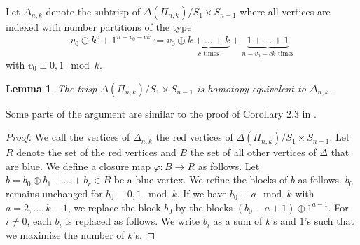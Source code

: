 \documentclass{elsarticle}
\newtheorem{lem}[df]{Lemma}
\begin{document}
Let $\Delta_{n,k}$ denote the subtrisp of $\Delta(\Pi_{n,k})/S_1\times S_{n-1}$ where all vertices are indexed with number partitions of the type
\[v_0\oplus k^c+1^{n-v_0-ck}:=v_0\oplus\underbrace{k+\dots+k}_\text{$c$ times}+\underbrace{1+\dots+1}_\text{$n-v_0-ck$ times}\]
with $v_0\equiv 0,1\mod k$.
\begin{lem}
\label{erste_closure}
The trisp $\Delta(\Pi_{n,k})/S_1\times S_{n-1}$ is homotopy equivalent to $\Delta_{n,k}$.
\end{lem}
Some parts of the argument are similar to the proof of Corollary 2.3 in \cite{clmap}.
\begin{proof}
We call the vertices of $\Delta_{n,k}$ the red vertices of $\Delta(\Pi_{n,k})/S_1\times S_{n-1}$. Let $R$ denote the set of the red vertices and $B$ the set of all other vertices of $\Delta$ that are blue. We define a closure map $\varphi:B\longrightarrow R$ as follows. Let $b=b_0\oplus b_1+\dots+b_r\in B$ be a blue vertex. We refine the blocks of $b$ as follows. $b_0$ remains unchanged for $b_0\equiv 0,1\mod k$. If we have $b_0\equiv a\mod k$ with $a=2,\dots,k-1$, we replace the block $b_0$ by the blocks $(b_0-a+1)\oplus1^{a-1}$. For $i\not=0$, each $b_i$ is replaced as follows. We write $b_i$ as a sum of $k$'s and $1$'s such that we maximize the number of $k$'s.


\end{proof}
\end{document}
